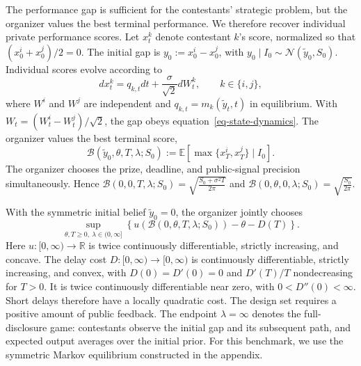 \documentclass[mnsc]{informs3}
\begin{document}
The performance gap is sufficient for the contestants' strategic problem, but the organizer values the best terminal performance. We therefore recover individual private performance scores. Let $x_t^k$ denote contestant $k$'s score, normalized so that $(x_0^i+x_0^j)/2=0$. The initial gap is $y_0:=x_0^i-x_0^j$, with $y_0\mid I_0\sim\mathcal N(\tilde y_0,S_0)$.
Individual scores evolve according to
\begin{equation}\label{eq-individual-output-dynamics}
dx_t^k=q_{k,t}dt+\frac{\sigma}{\sqrt2}dW_t^k,
\qquad k\in\{i,j\},
\end{equation}
where $W^i$ and $W^j$ are independent and $q_{k,t}=m_k(\tilde y_t,t)$ in equilibrium. With $W_t=(W_t^i-W_t^j)/\sqrt2$, the gap obeys equation~\eqref{eq-state-dynamics}. The organizer values the best terminal score,
\[
\mathcal B(\tilde y_0,\theta,T,\lambda;S_0)
:=\mathbb E[\max\{x_T^i,x_T^j\}\mid I_0].
\]
The organizer chooses the prize, deadline, and public-signal precision simultaneously.
Hence $\mathcal B(0,0,T,\lambda;S_0)
=\sqrt{\frac{S_0+\sigma^2T}{2\pi}}$ and
$\mathcal B(0,\theta,0,\lambda;S_0)
=\sqrt{\frac{S_0}{2\pi}}$.



With the symmetric initial belief $\tilde y_0=0$, the organizer jointly chooses
\begin{equation}\label{eq-designer-best-output-objective}
\sup_{\theta,T\geq0,\ \lambda\in(0,\infty]}
\left\{u\!\left(\mathcal B(0,\theta,T,\lambda;S_0)\right)
-\theta-D(T)\right\}.
\end{equation}
Here $u:[0,\infty)\to\mathbb R$ is twice continuously differentiable, strictly increasing, and concave. The delay cost $D:[0,\infty)\to[0,\infty)$ is continuously differentiable, strictly increasing, and convex, with $D(0)=D'(0)=0$ and $D'(T)/T$ nondecreasing for $T>0$. It is twice continuously differentiable near zero, with $0<D''(0)<\infty$. Short delays therefore have a locally quadratic cost.
The design set requires a positive amount of public feedback. The endpoint $\lambda=\infty$ denotes the full-disclosure game: contestants observe the initial gap and its subsequent path, and expected output averages over the initial prior. For this benchmark, we use the symmetric Markov equilibrium constructed in the appendix.
\end{document}
